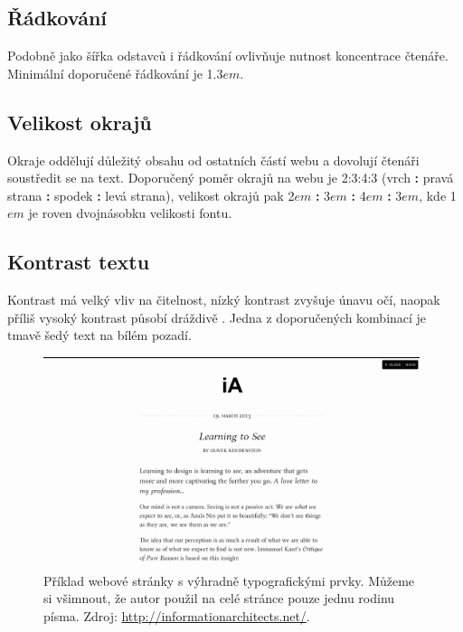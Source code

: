 \subsection{Řádkování}

Podobně jako šířka odstavců i řádkování ovlivňuje nutnost koncentrace čtenáře. Minimální doporučené řádkování je 1.3$em$.

\subsection{Velikost okrajů}

Okraje oddělují důležitý obsahu od ostatních částí webu a dovolují čtenáři soustředit se na text. Doporučený poměr okrajů na webu je 2:3:4:3 (vrch \textbf{:} pravá strana \textbf{:} spodek \textbf{:} levá strana), velikost okrajů pak 2$em$ \textbf{:} 3$em$ \textbf{:} 4$em$ \textbf{:} 3$em$, kde 1$em$ je roven dvojnásobku velikosti fontu.

\subsection{Kontrast textu}

Kontrast má velký vliv na čitelnost, nízký kontrast zvyšuje únavu očí, naopak příliš vysoký kontrast působí dráždivě \cite{eye-strain}. Jedna z doporučených kombinací je tmavě šedý text na bílém pozadí.

\begin{figure}[htbp]
    \centering
    \includegraphics[width=11cm]{images/typography.png}
    \caption{Příklad webové stránky s výhradně typografickými prvky. Můžeme si všimnout, že autor použil na celé stránce pouze jednu rodinu písma. Zdroj: \url{http://informationarchitects.net/}.}
    \label{fig:web-typography}
\end{figure}
